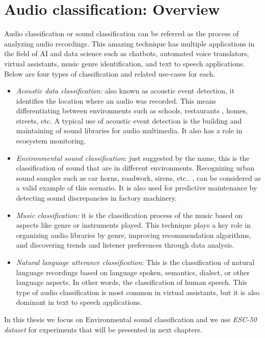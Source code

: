 \documentclass[english, LaM, oneside]{sapthesis}%
\begin{document}
\section{Audio classification: Overview}
Audio classification or sound classification can be referred as the process of analyzing audio recordings. This amazing technique has multiple applications in the field of AI and data science such as chatbots, automated voice translators, virtual assistants, music genre identification, and text to speech applications.
Below are four types of classification and related use-cases for each.
\begin{itemize}
    \item \textit{Acoustic data classification:} also known as acoustic event detection, it identifies the location where an audio was recorded. This means differentiating between environments such as schools, restaurants , homes, streets, etc. A typical use of acoustic event detection is the building and maintaining of sound libraries for audio multimedia. It also has a role in ecosystem monitoring.
    \item \textit{Environmental sound classification}: just suggested by the name, this is the classification of sound that are in different environments. Recognizing urban sound samples such as car horns, roadwork, sirens, etc.. , can be considered as a valid example of this scenario.  It is also used for predictive maintenance by detecting sound discrepancies in factory machinery. 
    \item\textit{ Music classification:} it is the classification process of the music based on aspects like genre or instruments played. This technique plays a key role in organizing audio libraries by genre, improving recommendation algorithms, and discovering trends and listener preferences through data analysis.
    \item\textit{ Natural language utterance classification}: This is the classification of natural language recordings based on language spoken, semantics, dialect, or other language aspects. In other words, the classification of human speech. This type of audio classification is most common in virtual assistants, but it is also dominant in text to speech applications.
\end{itemize}

In this thesis we focus on Environmental sound classification and we use \textit{ESC-50 dataset }\cite{esc} for experiments that will be presented in next chapters.
\end{document}
